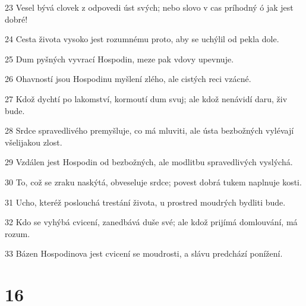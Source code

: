 \par 23 Vesel bývá clovek z odpovedi úst svých; nebo slovo v cas príhodný ó jak jest dobré!
\par 24 Cesta života vysoko jest rozumnému proto, aby se uchýlil od pekla dole.
\par 25 Dum pyšných vyvrací Hospodin, meze pak vdovy upevnuje.
\par 26 Ohavností jsou Hospodinu myšlení zlého, ale cistých reci vzácné.
\par 27 Kdož dychtí po lakomství, kormoutí dum svuj; ale kdož nenávidí daru, živ bude.
\par 28 Srdce spravedlivého premyšluje, co má mluviti, ale ústa bezbožných vylévají všelijakou zlost.
\par 29 Vzdálen jest Hospodin od bezbožných, ale modlitbu spravedlivých vyslýchá.
\par 30 To, což se zraku naskýtá, obveseluje srdce; povest dobrá tukem naplnuje kosti.
\par 31 Ucho, kteréž poslouchá trestání života, u prostred moudrých bydliti bude.
\par 32 Kdo se vyhýbá cvicení, zanedbává duše své; ale kdož prijímá domlouvání, má rozum.
\par 33 Bázen Hospodinova jest cvicení se moudrosti, a slávu predchází ponížení.

\chapter{16}

